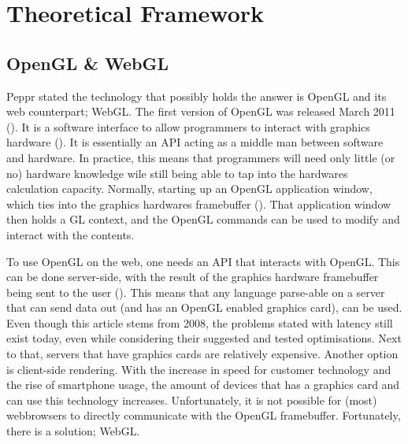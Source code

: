 %
\chapter{Theoretical Framework}

\section{OpenGL \& WebGL}
Peppr stated the technology that possibly holds the answer is OpenGL and its web counterpart; WebGL.
The first version of OpenGL was released March 2011 (\cite{openGLsite}). It is a software interface to allow programmers to interact with graphics hardware (\cite{openGLSpecification}). It is essentially an API acting as a middle man between software and hardware. In practice, this means that programmers will need only little (or no) hardware knowledge wile still being able to tap into the hardwares calculation capacity. Normally, starting up an OpenGL application window, which ties into the graphics hardwares framebuffer (\cite{framebuffer}). That application window then holds a GL context, and the OpenGL commands can be used to modify and interact with the contents.

To use OpenGL on the web, one needs an API that interacts with OpenGL. This can be done server-side, with the result of the graphics hardware framebuffer being sent to the user (\cite{CRRS}). This means that any language parse-able on a server that can send data out (and has an OpenGL enabled graphics card), can be used. Even though this article stems from 2008, the problems stated with latency still exist today, even while considering their suggested and tested optimisations. Next to that, servers that have graphics cards are relatively expensive. Another option is client-side rendering. With the increase in speed for customer technology and the rise of smartphone usage, the amount of devices that has a graphics card and can use this technology increases. Unfortunately, it is not possible for (most) webbrowsers to directly communicate with the OpenGL framebuffer. Fortunately, there is a solution; WebGL.


